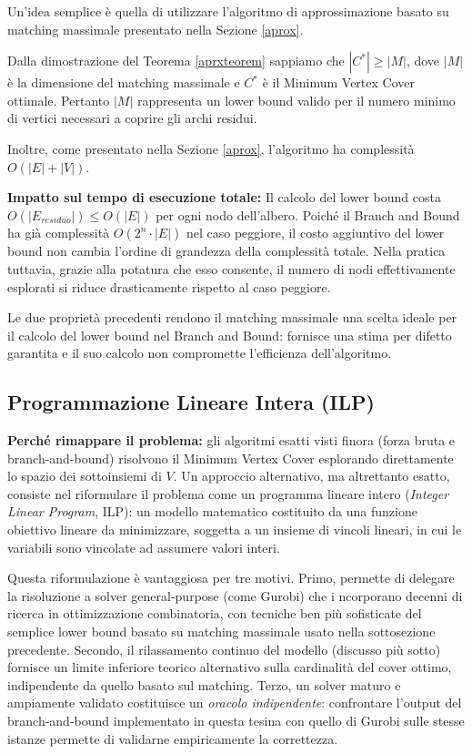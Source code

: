 Un'idea semplice è quella di utilizzare l'algoritmo di approssimazione basato su matching massimale presentato nella Sezione \ref{aprox}. 

Dalla dimostrazione del Teorema \ref{aprxteorem} sappiamo che $|C^*| \geq |M|$, dove $|M|$ è la dimensione del matching massimale e $C^*$ è il Minimum Vertex Cover ottimale. Pertanto $|M|$ rappresenta un lower bound valido per il numero minimo di vertici necessari a coprire gli archi residui.

Inoltre, come presentato nella Sezione \ref{aprox}, l'algoritmo ha complessità $O(|E|+|V|)$.

\textbf{Impatto sul tempo di esecuzione totale: } Il calcolo del lower bound costa $O(|E_{residuo}|) \leq O(|E|)$ per ogni nodo dell'albero. Poiché il Branch and Bound ha già complessità $O(2^n \cdot |E|)$ nel caso peggiore, il costo aggiuntivo del lower bound non cambia l'ordine di grandezza della complessità totale. Nella pratica tuttavia, grazie alla potatura che esso consente, il numero di nodi effettivamente esplorati si riduce drasticamente rispetto al caso peggiore.

Le due proprietà precedenti rendono il matching massimale una scelta 
ideale per il calcolo del lower bound nel Branch and Bound: fornisce 
una stima per difetto garantita e il suo calcolo non compromette 
l'efficienza dell'algoritmo.

\subsection{Programmazione Lineare Intera (ILP)} \label{ilp}

\textbf{Perché rimappare il problema:} gli algoritmi esatti visti finora (forza bruta e branch-and-bound) 
risolvono il Minimum Vertex Cover esplorando direttamente lo spazio dei sottoinsiemi di $V$. 
Un approccio alternativo, ma altrettanto esatto, consiste nel riformulare il problema come 
un programma lineare intero (\textit{Integer Linear Program}, ILP): 
un modello matematico costituito da una funzione obiettivo lineare da minimizzare, 
soggetta a un insieme di vincoli lineari, in cui le variabili sono vincolate ad assumere 
valori interi.

Questa riformulazione è vantaggiosa per tre motivi. 
Primo, permette di delegare la risoluzione a solver general-purpose (come Gurobi) che i
ncorporano decenni di ricerca in ottimizzazione combinatoria, con tecniche ben più sofisticate del 
semplice lower bound basato su matching massimale usato nella sottosezione precedente. 
Secondo, il rilassamento continuo del modello (discusso più sotto) fornisce un limite inferiore 
teorico alternativo sulla cardinalità del cover ottimo, indipendente da quello basato sul matching. 
Terzo, un solver maturo e ampiamente validato costituisce un \textit{oracolo indipendente}: 
confrontare l'output del branch-and-bound implementato in questa tesina con quello di Gurobi 
sulle stesse istanze permette di validarne empiricamente la correttezza.

